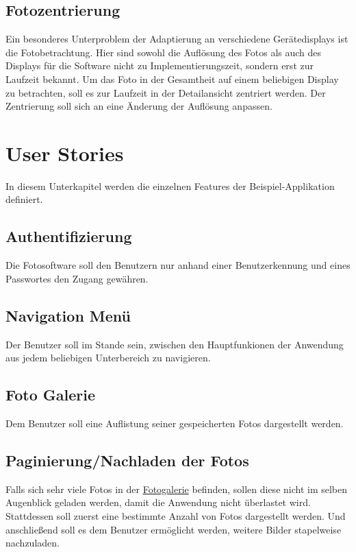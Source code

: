 \subsection{Fotozentrierung}
\label{sec:spec:photo_centering}

Ein besonderes Unterproblem der Adaptierung an verschiedene Gerätedisplays ist die Fotobetrachtung. Hier sind sowohl die Auflösung des Fotos als auch des Displays für die Software nicht zu Implementierungszeit, sondern erst zur Laufzeit bekannt. Um das Foto in der Gesamtheit auf einem beliebigen Display zu betrachten, soll es zur Laufzeit in der Detailansicht zentriert werden. Der Zentrierung soll sich an eine Änderung der Auflösung anpassen.

\section{User Stories}

In diesem Unterkapitel werden die einzelnen Features der Beispiel-Applikation definiert.

\subsection{Authentifizierung}
\label{sec:spec:authentication}

Die Fotosoftware soll den Benutzern nur anhand einer Benutzerkennung und eines Passwortes den Zugang gewähren.

\subsection{Navigation Menü}
\label{sec:spec:menu}

Der Benutzer soll im Stande sein, zwischen den Hauptfunkionen der Anwendung aus jedem beliebigen Unterbereich zu navigieren.

\subsection{Foto Galerie}
\label{sec:spec:photo_gallery}

Dem Benutzer soll eine Auflistung seiner gespeicherten Fotos dargestellt werden.

\subsection{Paginierung/Nachladen der Fotos}
\label{sec:spec:pagination}

Falls sich sehr viele Fotos in der \hyperref[sec:spec:photo_gallery]{Fotogalerie} befinden, sollen diese nicht im selben Augenblick geladen werden, damit die Anwendung nicht überlastet wird. Stattdessen soll zuerst eine bestimmte Anzahl von Fotos dargestellt werden. Und anschließend soll es dem Benutzer ermöglicht werden, weitere Bilder stapelweise nachzuladen.


